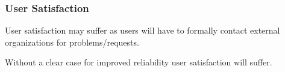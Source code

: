 \documentclass[12pt,a4paper]{article}
\begin{document}
\subsubsection*{User Satisfaction}
\bitm
\item User satisfaction may suffer as \EC users will have to formally contact external organizations for problems/requests.
  \item Without a clear case for improved reliability user satisfaction will suffer.
\eitm


\newpage
{}

\end{document}
